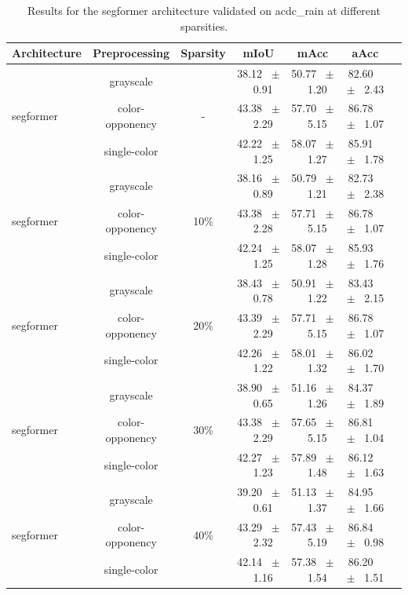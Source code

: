 \begin{table}[h]
  \centering
  \caption{Results for the segformer architecture validated on acdc_rain at different sparsities.}
  \begin{tabular}{@{}lccc ccc@{}}
    \toprule
    Architecture & Preprocessing & Sparsity & mIoU & mAcc & aAcc \\
    \midrule

    \multirow{3}{*}{segformer} & grayscale & \multirow{3}{*}{-} & 38.12 ~$\pm$~ 0.91 & 50.77 ~$\pm$~ 1.20 & 82.60 ~$\pm$~ 2.43 \\
    & color-opponency &  & 43.38 ~$\pm$~ 2.29 & 57.70 ~$\pm$~ 5.15 & 86.78 ~$\pm$~ 1.07 \\
    & single-color &  & 42.22 ~$\pm$~ 1.25 & 58.07 ~$\pm$~ 1.27 & 85.91 ~$\pm$~ 1.78 \\
    \midrule
    \multirow{3}{*}{segformer} & grayscale & \multirow{3}{*}{10\%} & 38.16 ~$\pm$~ 0.89 & 50.79 ~$\pm$~ 1.21 & 82.73 ~$\pm$~ 2.38 \\
    & color-opponency &  & 43.38 ~$\pm$~ 2.28 & 57.71 ~$\pm$~ 5.15 & 86.78 ~$\pm$~ 1.07 \\
    & single-color &  & 42.24 ~$\pm$~ 1.25 & 58.07 ~$\pm$~ 1.28 & 85.93 ~$\pm$~ 1.76 \\
    \midrule
    \multirow{3}{*}{segformer} & grayscale & \multirow{3}{*}{20\%} & 38.43 ~$\pm$~ 0.78 & 50.91 ~$\pm$~ 1.22 & 83.43 ~$\pm$~ 2.15 \\
    & color-opponency &  & 43.39 ~$\pm$~ 2.29 & 57.71 ~$\pm$~ 5.15 & 86.78 ~$\pm$~ 1.07 \\
    & single-color &  & 42.26 ~$\pm$~ 1.22 & 58.01 ~$\pm$~ 1.32 & 86.02 ~$\pm$~ 1.70 \\
    \midrule
    \multirow{3}{*}{segformer} & grayscale & \multirow{3}{*}{30\%} & 38.90 ~$\pm$~ 0.65 & 51.16 ~$\pm$~ 1.26 & 84.37 ~$\pm$~ 1.89 \\
    & color-opponency &  & 43.38 ~$\pm$~ 2.29 & 57.65 ~$\pm$~ 5.15 & 86.81 ~$\pm$~ 1.04 \\
    & single-color &  & 42.27 ~$\pm$~ 1.23 & 57.89 ~$\pm$~ 1.48 & 86.12 ~$\pm$~ 1.63 \\
    \midrule
    \multirow{3}{*}{segformer} & grayscale & \multirow{3}{*}{40\%} & 39.20 ~$\pm$~ 0.61 & 51.13 ~$\pm$~ 1.37 & 84.95 ~$\pm$~ 1.66 \\
    & color-opponency &  & 43.29 ~$\pm$~ 2.32 & 57.43 ~$\pm$~ 5.19 & 86.84 ~$\pm$~ 0.98 \\
    & single-color &  & 42.14 ~$\pm$~ 1.16 & 57.38 ~$\pm$~ 1.54 & 86.20 ~$\pm$~ 1.51 \\

\end{tabular}
\end{table}
